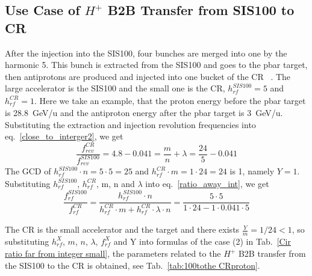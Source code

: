 \subsection{Use Case of $H^{+}$ B2B Transfer from SIS100 to CR} 
After the injection into the SIS100, four bunches are merged into one by the harmonic 5. This bunch is extracted from the SIS100 and goes to the pbar target, then antiprotons are produced and injected into one bucket of the CR ~\cite{steck_demonstration_2011}. The large accelerator is the SIS100 and the small one is the CR, $h^{\mathit{SIS100}}_\mathit{rf}=5$ and $h^{\mathit{CR}}_\mathit{rf}=1$. Here we take an example, that the proton energy before the pbar target is \SI{28.8}{GeV/\atomicmassunit} and the antiproton energy after the pbar target is \SI{3}{GeV/\atomicmassunit}. Substituting the extraction and injection revolution frequencies into eq.~\ref{close_to_interger2}, we get
\begin{equation} 
\frac{f_{\mathit{rev}}^{\mathit{CR}}}{f_{\mathit{rev}}^{\mathit{SIS100}}}=4.8-0.041=\frac{m}{n}+ \lambda=\frac{24}{5}-0.041
\end{equation}
The GCD of $h^{\mathit{SIS100}}_\mathit{rf}\cdot n=5\cdot5=25$ and $h^{\mathit{CR}}_\mathit{rf} \cdot m=1\cdot 24=24$ is 1, namely $Y=1$. Substituting $h^{\mathit{SIS100}}_\mathit{rf}$, $h^{\mathit{CR}}_\mathit{rf}$, m, n and $\lambda$ into eq.~\ref{ratio_away_int}, we get
\begin{equation} 
\frac{f_{\mathit{rf}}^{\mathit{SIS100}}}{f_{\mathit{rf}}^{\mathit{CR}}}=\frac{h^{\mathit{SIS100}}_\mathit{rf}\cdot n}{h^{\mathit{CR}}_\mathit{rf} \cdot m+ h^{\mathit{CR}}_\mathit{rf} \cdot\lambda\cdot n}=\frac{5\cdot 5}{1 \cdot 24- 1 \cdot0.041\cdot 5}
\end{equation}

The CR is the small accelerator and the target and there exists $\frac{Y}{m}=1/24<1$, so substituting $h^X_\mathit{rf}$, $m$, $n$, $\lambda$, $f_{\mathit{rf}}^{X}$ and Y into formulas of the case (2) in Tab.~\ref{Cir ratio far from integer small}, the parameters related to the $H^{+}$ B2B transfer from the SIS100 to the CR is obtained, see Tab.~\ref{tab:100tothe CRproton}.

